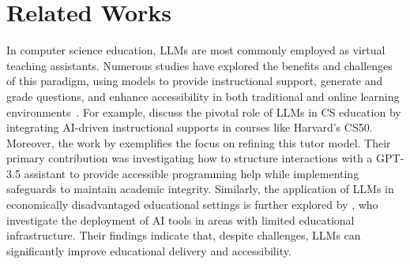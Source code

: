 \documentclass{article} %
\begin{document}
\section{Related Works}


In computer science education, LLMs are most commonly employed as virtual teaching assistants. Numerous studies have explored the benefits and challenges of this paradigm, using models to provide instructional support, generate and grade questions, and enhance accessibility in both traditional and online learning environments~\citep{markel_gpteach_2023, denny2024desirable, liu2024beyond, kazemitabaar2024codeaid}.
For
example, \cite{liu_teaching_2024} discuss the pivotal role of LLMs in
CS education by integrating AI-driven instructional supports in
courses like Harvard's CS50.  Moreover, the work by \cite{liu2024beyond} exemplifies the focus on refining this tutor model. Their primary contribution was investigating how to structure interactions with a GPT-3.5 assistant to provide accessible programming help while implementing safeguards to maintain academic integrity.
Similarly, the application of LLMs in economically disadvantaged educational
settings is further explored by \cite{choi2023llms},
who investigate the deployment of AI tools in areas with limited educational
infrastructure. Their findings indicate that, despite challenges, LLMs can
significantly improve educational delivery and accessibility.
\end{document}
